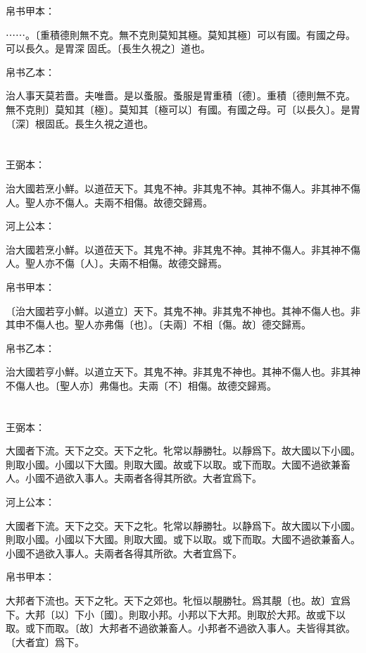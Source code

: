 \documentclass[a5paper]{ctexbook}
\begin{document}
    帛书甲本：

    ⋯⋯。〔重積德則無不克。無不克則莫知其極。莫知其極〕可以有國。有國之母。可以長久。是胃深󱁆固氐。〔長生久視之〕道也。

    帛书乙本：

    治人事天莫若嗇。夫唯嗇。是以蚤服。蚤服是胃重積〔德〕。重積〔德則無不克。無不克則〕莫知其〔極〕。莫知其〔極可以〕有國。有國之母。可〔以長久〕。是胃〔深〕根固氐。長生久視之道也。

    \chapter{}
    王弼本：

    治大國若烹小鮮。以道莅天下。其鬼不神。非其鬼不神。其神不傷人。非其神不傷人。聖人亦不傷人。夫兩不相傷。故德交歸焉。

    河上公本：

    治大國若烹小鮮。以道莅天下。其鬼不神。非其鬼不神。其神不傷人。非其神不傷人。聖人亦不傷〔人〕。夫兩不相傷。故德交歸焉。

    帛书甲本：

    〔治大國若亨小鮮。以道立〕天下。其鬼不神。非其鬼不神也。其神不傷人也。非其申不傷人也。聖人亦弗傷〔也〕。〔夫兩〕不相〔傷。故〕德交歸焉。

    帛书乙本：

    治大國若亨小鮮。以道立天下。其鬼不神。非其鬼不神也。其神不傷人也。非其神不傷人也。〔聖人亦〕弗傷也。夫兩〔不〕相傷。故德交歸焉。

    \chapter{}
    王弼本：

    大國者下流。天下之交。天下之牝。牝常以靜勝牡。以靜爲下。故大國以下小國。則取小國。小國以下大國。則取大國。故或下以取。或下而取。大國不過欲兼畜人。小國不過欲入事人。夫兩者各得其所欲。大者宜爲下。

    河上公本：

    大國者下流。天下之交。天下之牝。牝常以靜勝牡。以静爲下。故大國以下小國。則取小國。小國以下大國。則取大國。或下以取。或下而取。大國不過欲兼畜人。小國不過欲入事人。夫兩者各得其所欲。大者宜爲下。

    帛书甲本：

    大邦者下流也。天下之牝。天下之郊也。牝恒以靚勝牡。爲其靚〔也。故〕宜爲下。大邦〔以〕下小〔國〕。則取小邦。小邦以下大邦。則取於大邦。故或下以取。或下而取。〔故〕大邦者不過欲兼畜人。小邦者不過欲入事人。夫皆得其欲。〔大者宜〕爲下。
\end{document}
